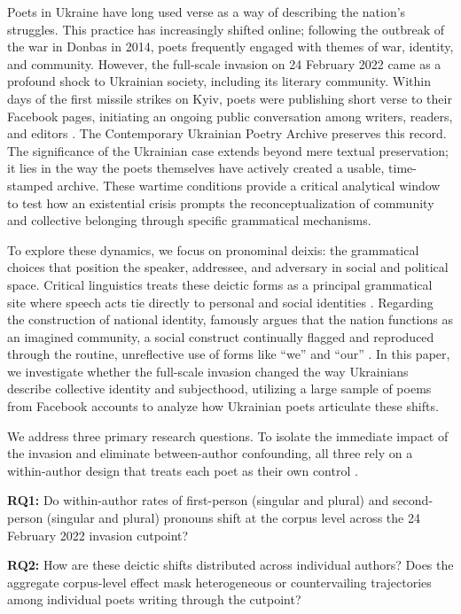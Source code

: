 \documentclass[12pt]{interact}
\theoremstyle{plain}%
\theoremstyle{definition}
\theoremstyle{remark}
\begin{document}
Poets in Ukraine have long used verse as a way of describing the nation’s struggles. This practice has increasingly shifted online; following the outbreak of the war in Donbas in 2014, poets frequently engaged with themes of war, identity, and community. However, the full-scale invasion on 24 February 2022 came as a profound shock to Ukrainian society, including its literary community. Within days of the first missile strikes on Kyiv, poets were publishing short verse to their Facebook pages, initiating an ongoing public conversation among writers, readers, and editors \citep{glaser2024poetry}. The Contemporary Ukrainian Poetry Archive \citep{glaser2024archive} preserves this record. The significance of the Ukrainian case extends beyond mere textual preservation; it lies in the way the poets themselves have actively created a usable, time-stamped archive. These wartime conditions provide a critical analytical window to test how an existential crisis prompts the reconceptualization of community and collective belonging through specific grammatical mechanisms.

To explore these dynamics, we focus on pronominal deixis: the grammatical choices that position the speaker, addressee, and adversary in social and political space. Critical linguistics treats these deictic forms as a principal grammatical site where speech acts tie directly to personal and social identities \citep{muhlhausler1990pronouns}. Regarding the construction of national identity, \citet{anderson2006imagined} famously argues that the nation functions as an imagined community, a social construct continually flagged and reproduced through the routine, unreflective use of forms like ``we'' and ``our'' \citep{billig1995banal}. In this paper, we investigate whether the full-scale invasion changed the way Ukrainians describe collective identity and subjecthood, utilizing a large sample of poems from Facebook accounts to analyze how Ukrainian poets articulate these shifts.

We address three primary research questions. To isolate the immediate impact of the invasion and eliminate between-author confounding, all three rely on a within-author design that treats each poet as their own control \citep{Hernn2016}.

\textbf{RQ1:} Do within-author rates of first-person (singular and plural) and second-person (singular and plural) pronouns shift at the corpus level across the 24 February 2022 invasion cutpoint?

\textbf{RQ2:} How are these deictic shifts distributed across individual authors? Does the aggregate corpus-level effect mask heterogeneous or countervailing trajectories among individual poets writing through the cutpoint?
\end{document}
